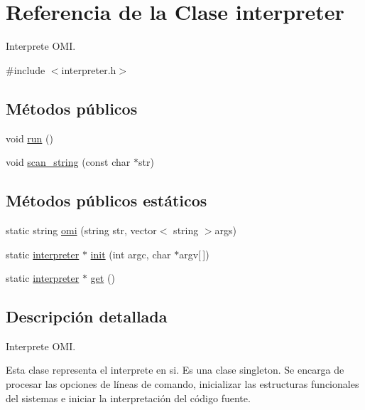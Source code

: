\hypertarget{classinterpreter}{\section{Referencia de la Clase interpreter}
\label{classinterpreter}
}


Interprete O\-M\-I.  




{\ttfamily \#include $<$interpreter.\-h$>$}

\subsection*{Métodos públicos}
\begin{DoxyCompactItemize}
\item 
void \hyperlink{classinterpreter_a337af48d3fc3ab498e9cf262e09badcc}{run} ()
\item 
void \hyperlink{classinterpreter_a1fbf329ec2c7892033d12ae614d437bf}{scan\-\_\-string} (const char $\ast$str)
\end{DoxyCompactItemize}
\subsection*{Métodos públicos estáticos}
\begin{DoxyCompactItemize}
\item 
static string \hyperlink{classinterpreter_aa82c4a511d7d8a720020bc8f010ba317}{omi} (string str, vector$<$ string $>$args)
\item 
static \hyperlink{classinterpreter}{interpreter} $\ast$ \hyperlink{classinterpreter_ab71b50ed1f535236eef302d1d855b7e6}{init} (int argc, char $\ast$argv\mbox{[}$\,$\mbox{]})
\item 
static \hyperlink{classinterpreter}{interpreter} $\ast$ \hyperlink{classinterpreter_a58047193876320b487dc44e4d0d627b2}{get} ()
\end{DoxyCompactItemize}


\subsection{Descripción detallada}
Interprete O\-M\-I. 

Esta clase representa el interprete en si. Es una clase singleton. Se encarga de procesar las opciones de líneas de comando, inicializar las estructuras funcionales del sistemas e iniciar la interpretación del código fuente. 


